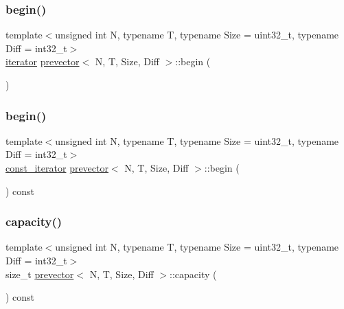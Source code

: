 \mbox{\label{classprevector_aa9210cbe708412a70868d6e0bca844c9}} 
\subsubsection{\texorpdfstring{begin()}{begin()}\hspace{0.1cm}{\footnotesize\ttfamily [1/2]}}
{\footnotesize\ttfamily template$<$unsigned int N, typename T, typename Size = uint32\+\_\+t, typename Diff = int32\+\_\+t$>$ \\
\mbox{\hyperlink{classprevector_1_1iterator}{iterator}} \mbox{\hyperlink{classprevector}{prevector}}$<$ N, T, Size, Diff $>$\+::begin (\begin{DoxyParamCaption}{ }\end{DoxyParamCaption})\hspace{0.3cm}{\ttfamily [inline]}}

\mbox{\label{classprevector_af446957224d60c10d7a5c9fd226cb003}} 
\subsubsection{\texorpdfstring{begin()}{begin()}\hspace{0.1cm}{\footnotesize\ttfamily [2/2]}}
{\footnotesize\ttfamily template$<$unsigned int N, typename T, typename Size = uint32\+\_\+t, typename Diff = int32\+\_\+t$>$ \\
\mbox{\hyperlink{classprevector_1_1const__iterator}{const\+\_\+iterator}} \mbox{\hyperlink{classprevector}{prevector}}$<$ N, T, Size, Diff $>$\+::begin (\begin{DoxyParamCaption}{ }\end{DoxyParamCaption}) const\hspace{0.3cm}{\ttfamily [inline]}}

\mbox{\label{classprevector_a833f4c9e5c4804fb8ac57b708657af24}} 
\subsubsection{\texorpdfstring{capacity()}{capacity()}}
{\footnotesize\ttfamily template$<$unsigned int N, typename T, typename Size = uint32\+\_\+t, typename Diff = int32\+\_\+t$>$ \\
size\+\_\+t \mbox{\hyperlink{classprevector}{prevector}}$<$ N, T, Size, Diff $>$\+::capacity (\begin{DoxyParamCaption}{ }\end{DoxyParamCaption}) const\hspace{0.3cm}{\ttfamily [inline]}}

